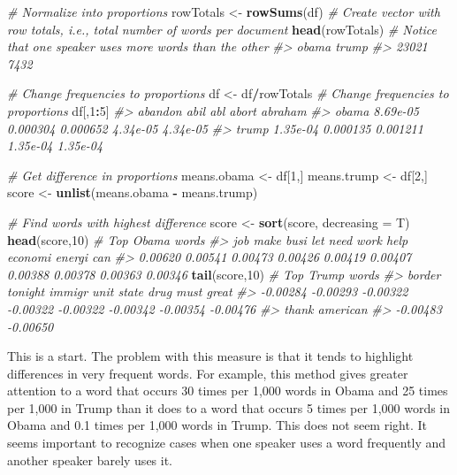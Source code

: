 \documentclass[
]{book}
\newenvironment{Shaded}{\begin{snugshade}}{\end{snugshade}}
\newcommand{\CommentTok}[1]{\textcolor[rgb]{0.56,0.35,0.01}{\textit{#1}}}
\newcommand{\DataTypeTok}[1]{\textcolor[rgb]{0.13,0.29,0.53}{#1}}
\newcommand{\DecValTok}[1]{\textcolor[rgb]{0.00,0.00,0.81}{#1}}
\newcommand{\KeywordTok}[1]{\textcolor[rgb]{0.13,0.29,0.53}{\textbf{#1}}}
\newcommand{\NormalTok}[1]{#1}
\newcommand{\OperatorTok}[1]{\textcolor[rgb]{0.81,0.36,0.00}{\textbf{#1}}}
\newcommand{\StringTok}[1]{\textcolor[rgb]{0.31,0.60,0.02}{#1}}
\begin{document}
\begin{Shaded}
\begin{Highlighting}[]
\CommentTok{# Normalize into proportions}
\NormalTok{rowTotals <-}\StringTok{ }\KeywordTok{rowSums}\NormalTok{(df) }\CommentTok{# Create vector with row totals, i.e., total number of words per document}
\KeywordTok{head}\NormalTok{(rowTotals) }\CommentTok{# Notice that one speaker uses more words than the other}
\CommentTok{#> obama trump }
\CommentTok{#> 23021  7432}

\CommentTok{# Change frequencies to proportions}
\NormalTok{df <-}\StringTok{ }\NormalTok{df}\OperatorTok{/}\NormalTok{rowTotals }\CommentTok{# Change frequencies to proportions}
\NormalTok{df[,}\DecValTok{1}\OperatorTok{:}\DecValTok{5}\NormalTok{]}
\CommentTok{#>        abandon     abil      abl    abort  abraham}
\CommentTok{#> obama 8.69e-05 0.000304 0.000652 4.34e-05 4.34e-05}
\CommentTok{#> trump 1.35e-04 0.000135 0.001211 1.35e-04 1.35e-04}

\CommentTok{# Get difference in proportions}
\NormalTok{means.obama <-}\StringTok{ }\NormalTok{df[}\DecValTok{1}\NormalTok{,]}
\NormalTok{means.trump <-}\StringTok{ }\NormalTok{df[}\DecValTok{2}\NormalTok{,]}
\NormalTok{score <-}\StringTok{ }\KeywordTok{unlist}\NormalTok{(means.obama }\OperatorTok{-}\StringTok{ }\NormalTok{means.trump)}

\CommentTok{# Find words with highest difference}
\NormalTok{score <-}\StringTok{ }\KeywordTok{sort}\NormalTok{(score, }\DataTypeTok{decreasing =}\NormalTok{ T)}
\KeywordTok{head}\NormalTok{(score,}\DecValTok{10}\NormalTok{) }\CommentTok{# Top Obama words}
\CommentTok{#>     job    make    busi     let    need    work    help economi  energi     can }
\CommentTok{#> 0.00620 0.00541 0.00473 0.00426 0.00419 0.00407 0.00388 0.00378 0.00363 0.00346}
\KeywordTok{tail}\NormalTok{(score,}\DecValTok{10}\NormalTok{) }\CommentTok{# Top Trump words}
\CommentTok{#>   border  tonight   immigr     unit    state     drug     must    great }
\CommentTok{#> -0.00284 -0.00293 -0.00322 -0.00322 -0.00322 -0.00342 -0.00354 -0.00476 }
\CommentTok{#>    thank american }
\CommentTok{#> -0.00483 -0.00650}
\end{Highlighting}
\end{Shaded}

This is a start. The problem with this measure is that it tends to highlight differences in very frequent words. For example, this method gives greater attention to a word that occurs 30 times per 1,000 words in Obama and 25 times per 1,000 in Trump than it does to a word that occurs 5 times per 1,000 words in Obama and 0.1 times per 1,000 words in Trump. This does not seem right. It seems important to recognize cases when one speaker uses a word frequently and another speaker barely uses it.
\end{document}
